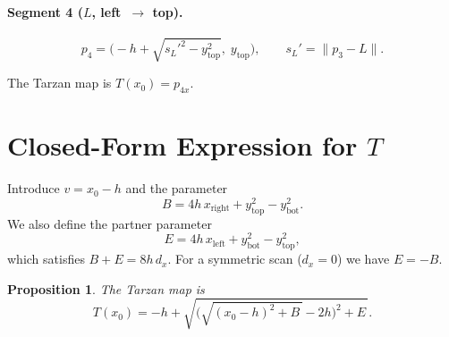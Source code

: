 \documentclass[11pt]{article}
\newtheorem{proposition}{Proposition}
\begin{document}
\paragraph{Segment 4 ($L$, left~$\to$ top).}
\begin{equation}
  p_4 = \bigl(-h + \sqrt{s_L'^2 - y_{\mathrm{top}}^2},\;
              y_{\mathrm{top}}\bigr),
  \qquad
  s_L' = \lVert p_3 - L \rVert.
\end{equation}

The Tarzan map is $T(x_0) = p_{4x}$.

\section{Closed-Form Expression for $T$}

Introduce $v = x_0 - h$ and the parameter
\begin{equation}\label{eq:B}
  \boxed{B = 4h\,x_{\mathrm{right}} + y_{\mathrm{top}}^2
             - y_{\mathrm{bot}}^2.}
\end{equation}
We also define the partner parameter
\begin{equation}\label{eq:E}
  E = 4h\,x_{\mathrm{left}} + y_{\mathrm{bot}}^2 - y_{\mathrm{top}}^2,
\end{equation}
which satisfies $B + E = 8h\,d_x$.
For a symmetric scan ($d_x = 0$) we have $E = -B$.

\begin{proposition}\label{prop:map}
The Tarzan map is
\begin{equation}\label{eq:T}
  T(x_0)
  = -h + \sqrt{\bigl(\sqrt{(x_0 - h)^2 + B\,} - 2h\bigr)^2 + E\,}.
\end{equation}
\end{proposition}
\end{document}
